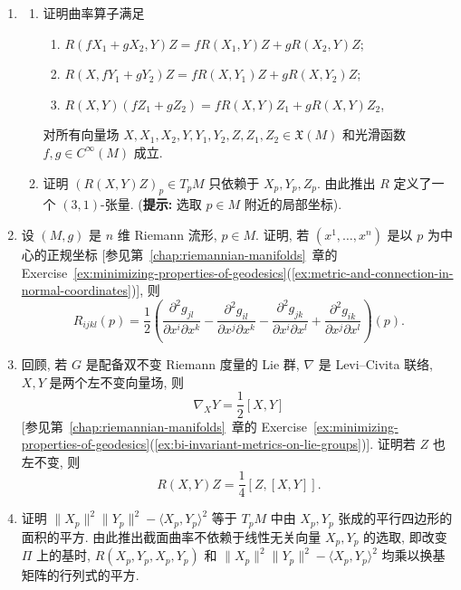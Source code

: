 \begin{RiemannExercise}\label{ex:curvature}
\begin{enumerate}[label=(\arabic*),ref=\arabic*,leftmargin=*]
\item\label{ex:tensoriality-of-curvature}
\begin{enumerate}[label=(\alph*),leftmargin=*]
\item 证明曲率算子满足
\begin{enumerate}[label=(\roman*),leftmargin=*]
\item $R(fX_1+gX_2,Y)Z=fR(X_1,Y)Z+gR(X_2,Y)Z$;
\item $R(X,fY_1+gY_2)Z=fR(X,Y_1)Z+gR(X,Y_2)Z$;
\item $R(X,Y)(fZ_1+gZ_2)=fR(X,Y)Z_1+gR(X,Y)Z_2$,
\end{enumerate}
对所有向量场 $X,X_1,X_2,Y,Y_1,Y_2,Z,Z_1,Z_2\in\mathfrak{X}(M)$ 和光滑函数 $f,g\in C^\infty(M)$ 成立.
\item 证明 $(R(X,Y)Z)_p\in T_pM$ 只依赖于 $X_p,Y_p,Z_p$. 由此推出 $R$ 定义了一个 $(3,1)$-张量.
{\small (\textbf{提示:} 选取 $p\in M$ 附近的局部坐标).}
\end{enumerate}
\item\label{ex:curvature-tensor-in-normal-coordinates} 设 $(M,g)$ 是 $n$ 维 Riemann 流形, $p\in M$. 证明, 若 $(x^1,\ldots,x^n)$ 是以 $p$ 为中心的正规坐标 [参见第~\ref{chap:riemannian-manifolds}~章的 Exercise~\ref{ex:minimizing-properties-of-geodesics}(\ref{ex:metric-and-connection-in-normal-coordinates})], 则
\[
  R_{ijkl}(p)=\frac12\left(\frac{\partial^2 g_{jl}}{\partial x^i\partial x^k}
  -\frac{\partial^2g_{il}}{\partial x^j\partial x^k}
  -\frac{\partial^2g_{jk}}{\partial x^i\partial x^l}
  +\frac{\partial^2g_{ik}}{\partial x^j\partial x^l}\right)(p).
\]
\item\label{ex:curvature-of-bi-invariant-metric} 回顾, 若 $G$ 是配备双不变 Riemann 度量的 Lie 群, $\nabla$ 是 Levi–Civita 联络, $X,Y$ 是两个左不变向量场, 则
\[
  \nabla_XY=\frac12[X,Y]
\]
[参见第~\ref{chap:riemannian-manifolds}~章的 Exercise~\ref{ex:minimizing-properties-of-geodesics}(\ref{ex:bi-invariant-metrics-on-lie-groups})]. 证明若 $Z$ 也左不变, 则
\[
  R(X,Y)Z=\frac14[Z,[X,Y]].
\]
\item\label{ex:sectional-curvature-independent-of-basis} 证明 $\lVert X_p\rVert^2\lVert Y_p\rVert^2-\langle X_p,Y_p\rangle^2$ 等于 $T_pM$ 中由 $X_p,Y_p$ 张成的平行四边形的面积的平方. 由此推出截面曲率不依赖于线性无关向量 $X_p,Y_p$ 的选取, 即改变 $\Pi$ 上的基时, $R(X_p,Y_p,X_p,Y_p)$ 和 $\lVert X_p\rVert^2\lVert Y_p\rVert^2-\langle X_p,Y_p\rangle^2$ 均乘以换基矩阵的行列式的平方.

\end{enumerate}
\end{RiemannExercise}
